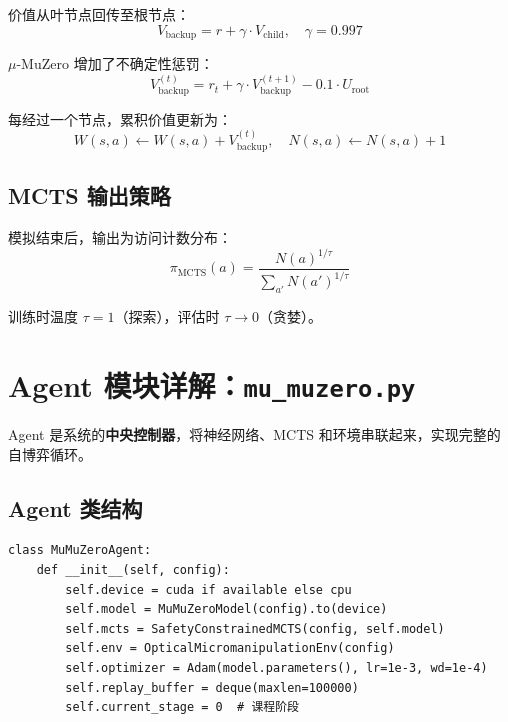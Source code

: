 \documentclass[UTF8, a4paper]{ctexart}
\begin{document}
价值从叶节点回传至根节点：
\begin{equation}
\boxed{V_{\text{backup}} = r + \gamma \cdot V_{\text{child}}, \quad \gamma = 0.997}
\end{equation}

$\mu$-MuZero 增加了不确定性惩罚：
\begin{equation}
V_{\text{backup}}^{(t)} = r_t + \gamma \cdot V_{\text{backup}}^{(t+1)} - 0.1 \cdot U_{\text{root}}
\end{equation}

每经过一个节点，累积价值更新为：
\begin{equation}
W(s, a) \leftarrow W(s, a) + V_{\text{backup}}^{(t)}, \quad N(s, a) \leftarrow N(s, a) + 1
\end{equation}

\subsection{MCTS 输出策略}

模拟结束后，输出为访问计数分布：
\begin{equation}
\pi_{\text{MCTS}}(a) = \frac{N(a)^{1/\tau}}{\sum_{a'} N(a')^{1/\tau}}
\end{equation}

训练时温度 $\tau = 1$（探索），评估时 $\tau \to 0$（贪婪）。

\newpage
\section{Agent 模块详解：\texttt{mu\_muzero.py}}

Agent 是系统的\textbf{中央控制器}，将神经网络、MCTS 和环境串联起来，实现完整的自博弈循环。

\subsection{Agent 类结构}

\begin{lstlisting}
class MuMuZeroAgent:
    def __init__(self, config):
        self.device = cuda if available else cpu
        self.model = MuMuZeroModel(config).to(device)
        self.mcts = SafetyConstrainedMCTS(config, self.model)
        self.env = OpticalMicromanipulationEnv(config)
        self.optimizer = Adam(model.parameters(), lr=1e-3, wd=1e-4)
        self.replay_buffer = deque(maxlen=100000)
        self.current_stage = 0  # 课程阶段
\end{lstlisting}
\end{document}
